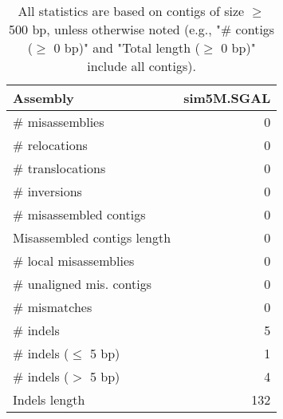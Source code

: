 \documentclass[12pt,a4paper]{article}
\begin{document}
\begin{table}[ht]
\begin{center}
\caption{All statistics are based on contigs of size $\geq$ 500 bp, unless otherwise noted (e.g., "\# contigs ($\geq$ 0 bp)" and "Total length ($\geq$ 0 bp)" include all contigs).}
\begin{tabular}{|l*{1}{|r}|}
\hline
Assembly & sim5M.SGAL \\ \hline
\# misassemblies & 0 \\ \hline
\hspace{5mm}\# relocations & 0 \\ \hline
\hspace{5mm}\# translocations & 0 \\ \hline
\hspace{5mm}\# inversions & 0 \\ \hline
\# misassembled contigs & 0 \\ \hline
Misassembled contigs length & 0 \\ \hline
\# local misassemblies & 0 \\ \hline
\# unaligned mis. contigs & 0 \\ \hline
\# mismatches & 0 \\ \hline
\# indels & 5 \\ \hline
\hspace{5mm}\# indels ($\leq$ 5 bp) & 1 \\ \hline
\hspace{5mm}\# indels ($>$ 5 bp) & 4 \\ \hline
Indels length & 132 \\ \hline
\end{tabular}
\end{center}
\end{table}
\end{document}
